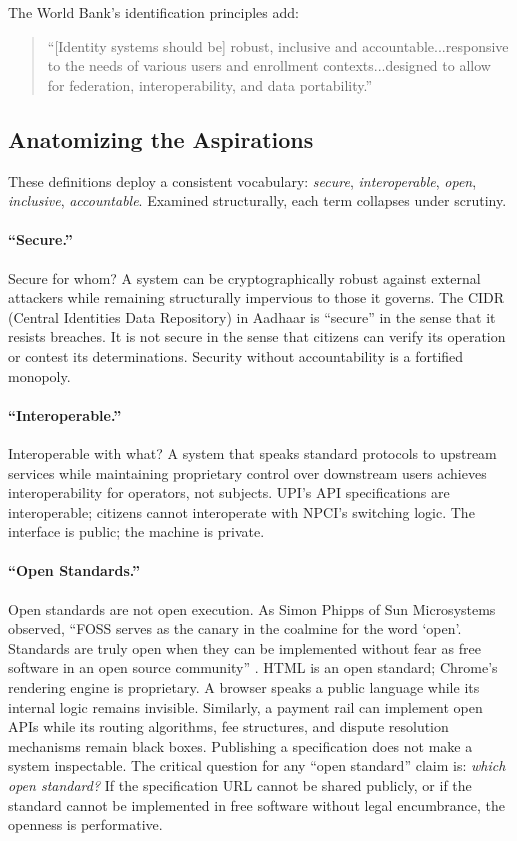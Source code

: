 \documentclass{article}
\begin{document}
The World Bank's identification principles add:

\begin{quote}
``[Identity systems should be] robust, inclusive and accountable...responsive to the needs of various users and enrollment contexts...designed to allow for federation, interoperability, and data portability.''
\end{quote}

\subsection{Anatomizing the Aspirations}

These definitions deploy a consistent vocabulary: \textit{secure}, \textit{interoperable}, \textit{open}, \textit{inclusive}, \textit{accountable}. Examined structurally, each term collapses under scrutiny.

\paragraph{``Secure.''}  Secure for whom? A system can be cryptographically robust against external attackers while remaining structurally impervious to those it governs. The CIDR (Central Identities Data Repository) in Aadhaar is ``secure'' in the sense that it resists breaches. It is not secure in the sense that citizens can verify its operation or contest its determinations. Security without accountability is a fortified monopoly.

\paragraph{``Interoperable.''}  Interoperable with what? A system that speaks standard protocols to upstream services while maintaining proprietary control over downstream users achieves interoperability for operators, not subjects. UPI's API specifications are interoperable; citizens cannot interoperate with NPCI's switching logic. The interface is public; the machine is private.

\paragraph{``Open Standards.''}  Open standards are not open execution. As Simon Phipps of Sun Microsystems observed, ``FOSS serves as the canary in the coalmine for the word `open'. Standards are truly open when they can be implemented without fear as free software in an open source community'' \citep{phipps2007}. HTML is an open standard; Chrome's rendering engine is proprietary. A browser speaks a public language while its internal logic remains invisible. Similarly, a payment rail can implement open APIs while its routing algorithms, fee structures, and dispute resolution mechanisms remain black boxes. Publishing a specification does not make a system inspectable. The critical question for any ``open standard'' claim is: \textit{which open standard?} If the specification URL cannot be shared publicly, or if the standard cannot be implemented in free software without legal encumbrance, the openness is performative.
\end{document}
